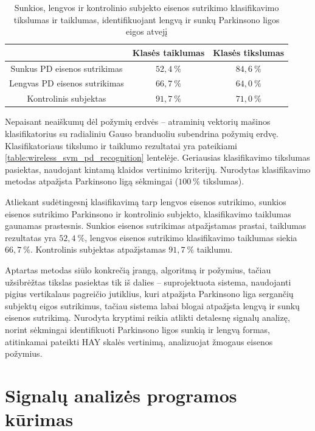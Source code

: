 \documentclass[]{vgtuef}
\begin{document}
\begin{table}
	\centering
	\renewcommand{\arraystretch}{1.3}
	\caption{Sunkios, lengvos ir kontrolinio subjekto eisenos sutrikimo klasifikavimo tikslumas ir taiklumas, identifikuojant lengvą ir sunkų Parkinsono ligos eigos atvejį \cite{5627904}}
	\label{table:wireless_svm_recognition}
	\begin{tabular}{|c|c|c|} \hline
		& Klasės taiklumas & Klasės tikslumas \\ \hline
	Sunkus PD eisenos sutrikimas & $52,4~\%$ & $84,6~\%$ \\ \hline
	Lengvas PD eisenos sutrikimas & $66,7~\%$ & $64,0~\%$ \\ \hline
	Kontrolinis subjektas & $91,7~\%$ & $71,0~\%$ \\ \hline
	\end{tabular}
\end{table}

Nepaisant neaiškumų dėl požymių erdvės -- atraminių vektorių mašinos klasifikatorius su radialiniu Gauso branduoliu subendrina požymių erdvę. Klasifikatoriaus tikslumo ir taiklumo rezultatai yra pateikiami \ref{table:wireless_svm_pd_recognition} lentelėje. Geriausias klasifikavimo tikslumas pasiektas, naudojant kintamą klaidos vertinimo kriterijų. Nurodytas klasifikavimo metodas atpažįsta Parkinsono ligą sėkmingai ($100~\%$ tikslumas).

Atliekant sudėtingesnį klasifikavimą tarp lengvos eisenos sutrikimo, sunkios eisenos sutrikimo Parkinsono ir kontrolinio subjekto, klasifikavimo taiklumas gaunamas prastesnis. Sunkios eisenos sutrikimas atpažįstamas prastai, taiklumas rezultatas yra $52,4~\%$, lengvos eisenos sutrikimo klasifikavimo taiklumas siekia $66,7~\%$. Kontrolinis subjektas atpažįstamas $91,7~\%$ taiklumu.

Aptartas metodas siūlo konkrečią įrangą, algoritmą ir požymius, tačiau užsibrėžtas tikslas pasiektas tik iš dalies -- suprojektuota sistema, naudojanti pigius vertikalaus pagreičio jutiklius, kuri atpažįsta Parkinsono liga sergančių subjektų eigos sutrikimus, tačiau sistema labai blogai atpažįsta lengvą ir sunkų eisenos sutrikimą. Nurodyta kryptimi reikia atlikti detalesnę signalų analizę, norint sėkmingai identifikuoti Parkinsono ligos sunkią ir lengvą formas, atitinkamai pateikti HAY skalės vertinimą, analizuojat žmogaus eisenos požymius.

\section{Signalų analizės programos kūrimas}
\end{document}
